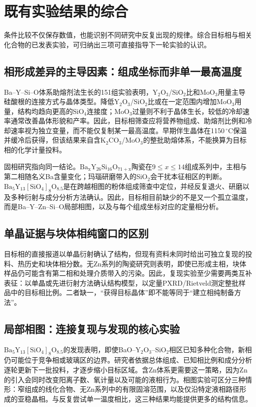 \section{既有实验结果的综合}
\label{sec:prior-findings}

条件比较不仅保存数值，也能识别不同研究中反复出现的规律。综合目标相与相关化合物的已发表实验，可归纳出三项可直接指导下一轮实验的认识。

\subsection{相形成差异的主导因素：组成坐标而非单一最高温度}

Ba--Y--Si--O体系助熔剂法生长的151组实验表明，Y$_2$O$_3$\slash SiO$_2$比和MoO$_3$用量主导硅酸根的连接方式与晶体类型。降低Y$_2$O$_3$\slash SiO$_2$比或在一定范围内增加MoO$_3$用量，结构均趋向更高的SiO$_4$连接度；MoO$_3$过量则不利于晶体生长，较低的冷却速率通常改善晶体形貌和产率\cite{wierzbickawieczorek2017high}。因此，目标相筛查应将营养物组成、助熔剂比例和冷却速率视为独立变量，而不能仅复制某一最高温度。早期伴生晶体在1150\,$^\circ$C保温并缓冷后获得，但该结果来自含K$_2$CO$_3$\slash MoO$_3$的整批助熔体系，不能换算为目标相的化学计量投料\cite{kolitsch2009crystal}。

固相研究指向同一结论。$\mathrm{Ba_xY_{26}Si_{16}O_{71+x}}$陶瓷在$9\le x\le 14$组成系列中，主相与第二相随名义Ba含量变化；玛瑙研磨带入的SiO$_2$会干扰本征相区的判断\cite{yamane2024microstructure}。$\mathrm{Ba_5Y_{13}[SiO_4]_8O_{8.5}}$是在跨越相图的粉体组成筛查中定位，并经反复退火、研磨以及多种衍射与成分分析方法确认\cite{gulay2024navigation}。因此，目标相目前缺少的不是又一个孤立温度，而是Ba--Y--Zn--Si--O局部相图，以及与每个组成坐标对应的定量相分析。

\subsection{单晶证据与块体相纯窗口的区别}

目标相的直接报道以单晶衍射确认了结构，但现有资料未同时给出可独立复现的投料、热历史和块体相分数\cite{ababaikeri2024ba5y12zn}。无Zn系列的陶瓷研究则表明，即使已形成主相，块体样品仍可能含有第二相和处理介质带入的污染\cite{yamane2024microstructure,gulay2024navigation}。因此，复现实验至少需要两类互补表征：以单晶或先进衍射方法确认结构模型，以定量PXRD\slash Rietveld测定整批样品中的目标相比例。二者缺一，“获得目标晶体”即不能等同于“建立相纯制备方法”。

\subsection{局部相图：连接复现与发现的核心实验}

$\mathrm{Ba_5Y_{13}[SiO_4]_8O_{8.5}}$的发现表明，即使BaO--Y$_2$O$_3$--SiO$_2$相区已知多种化合物，新相仍可能位于竞争相或玻璃区的边界。研究者依据总体组成、已知相比例和成分分析逐轮更新下一批投料，才逐步缩小目标区域\cite{gulay2024navigation}。含Zn体系更需要这一策略，因为Zn的引入会同时改变阳离子数、氧计量以及可能的液相行为。相图实验可区分三种情形：窄组成的线化合物、无Zn系列中的有限固溶范围，以及仅沿特定液相路径形成的亚稳晶相。与反复尝试单一温度相比，这三种结果均能提供更多的结构信息。
